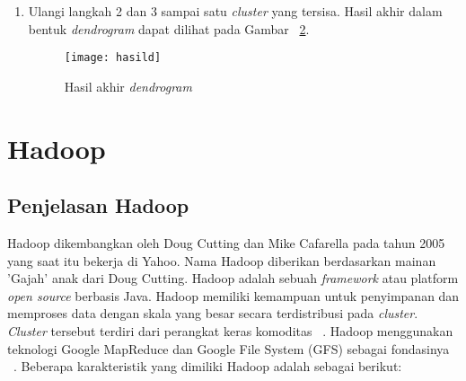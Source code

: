 \begin{enumerate}
\begin{align} 
d(A,C) & = \sqrt{(2 - 2)^2+(4 - 6)^2} \\
& = 4.47 
\end{align}
\begin{align} 
d(B,C) & = \sqrt{(2 - 3)^2+(4 - 6)^2} \\
& = 3.61 
\end{align}\\


Karena nilai 3.61 lebih kecil dari 4.47, maka nilai 3.61 diambil sebagai hasil. Contoh hasil dapat dilihat pada Gambar ~\ref{fig:step3}. 

\begin{figure}[H]
    \centering  
    \texttt{[image: step3]}  
    \caption[Hasil rekalkulasi]{Hasil rekalkulasi} 
    \label{fig:step3} 
\end{figure}

\item Ulangi langkah 2 dan 3 sampai satu \textit{cluster} yang tersisa. Hasil akhir dalam bentuk \textit{dendrogram} dapat dilihat pada Gambar ~\ref{fig:hasild}.

\begin{figure}[H]
    \centering  
    \texttt{[image: hasild]}  
    \caption[Hasil akhir \textit{dendrogram} ]{Hasil akhir \textit{dendrogram}} 
    \label{fig:hasild} 
\end{figure}

\end{enumerate}


\section{Hadoop}

\subsection{Penjelasan Hadoop}

Hadoop dikembangkan oleh Doug Cutting dan Mike Cafarella pada tahun 2005 yang saat itu bekerja di Yahoo. Nama Hadoop diberikan berdasarkan mainan 'Gajah' anak dari Doug Cutting. Hadoop adalah sebuah \textit{framework} atau platform \textit{open source} berbasis Java. Hadoop memiliki kemampuan untuk penyimpanan dan memproses data dengan skala yang besar secara terdistribusi pada {\it cluster}. {\it Cluster} tersebut terdiri dari perangkat keras komoditas ~\cite{alexholmes:04:hip}. Hadoop menggunakan teknologi Google MapReduce dan Google File System (GFS) sebagai fondasinya ~\cite{tomwhite:05:htdg}. Beberapa karakteristik yang dimiliki Hadoop adalah sebagai berikut:


